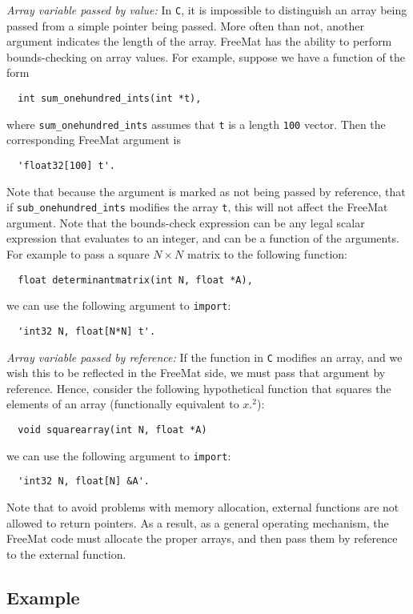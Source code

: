 \emph{Array variable passed by value:}
In \verb|C|, it is impossible to distinguish an array being passed from
a simple pointer being passed.  More often than not, another argument
indicates the length of the array.  FreeMat has the ability to perform
bounds-checking on array values.  For example, suppose we have a function
of the form
\begin{verbatim}
  int sum_onehundred_ints(int *t),
\end{verbatim}
where \verb|sum_onehundred_ints| assumes that \verb|t| is a length \verb|100| vector. 
Then the corresponding FreeMat argument is
\begin{verbatim}
  'float32[100] t'.
\end{verbatim}
Note that because the argument is marked as not being passed by reference,
that if \verb|sub_onehundred_ints| modifies the array \verb|t|, this
will not affect the FreeMat argument.  Note that the bounds-check expression
can be any legal scalar expression that evaluates to an integer, and can be
a function of the arguments.  For example to pass a square $N \times N$ 
matrix to the following function:
\begin{verbatim}
  float determinantmatrix(int N, float *A),
\end{verbatim}
we can use the following argument to \verb|import|:
\begin{verbatim}
  'int32 N, float[N*N] t'.
\end{verbatim}

\emph{Array variable passed by reference:}
If the function in \verb|C| modifies an array, and we wish this to be
reflected in the FreeMat side, we must pass that argument by reference.
Hence, consider the following hypothetical function that squares the
elements of an array (functionally equivalent to $x.^2$):
\begin{verbatim}
  void squarearray(int N, float *A)
\end{verbatim}
we can use the following argument to \verb|import|:
\begin{verbatim}
  'int32 N, float[N] &A'.
\end{verbatim}
Note that to avoid problems with memory allocation, external functions
are not allowed to return pointers.  As a result, as a general operating
mechanism, the FreeMat code must allocate the proper arrays, and then
pass them by reference to the external function.

\subsection{Example}

